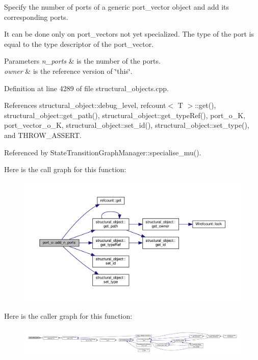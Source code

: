 Specify the number of ports of a generic port\+\_\+vector object and add its corresponding ports. 

It can be done only on port\+\_\+vectors not yet specialized. The type of the port is equal to the type descriptor of the port\+\_\+vector. 
\begin{DoxyParams}{Parameters}
{\em n\+\_\+ports} & is the number of the ports. \\
\hline
{\em owner} & is the reference version of \char`\"{}this\char`\"{}. \\
\hline
\end{DoxyParams}


Definition at line 4289 of file structural\+\_\+objects.\+cpp.



References structural\+\_\+object\+::debug\+\_\+level, refcount$<$ T $>$\+::get(), structural\+\_\+object\+::get\+\_\+path(), structural\+\_\+object\+::get\+\_\+type\+Ref(), port\+\_\+o\+\_\+K, port\+\_\+vector\+\_\+o\+\_\+K, structural\+\_\+object\+::set\+\_\+id(), structural\+\_\+object\+::set\+\_\+type(), and T\+H\+R\+O\+W\+\_\+\+A\+S\+S\+E\+RT.



Referenced by State\+Transition\+Graph\+Manager\+::specialise\+\_\+mu().

Here is the call graph for this function\+:
\nopagebreak
\begin{figure}[H]
\begin{center}
\leavevmode
\includegraphics[width=350pt]{df/d75/structport__o_adf5180258c79071f73582bf9427a8f06_cgraph}
\end{center}
\end{figure}
Here is the caller graph for this function\+:
\nopagebreak
\begin{figure}[H]
\begin{center}
\leavevmode
\includegraphics[width=350pt]{df/d75/structport__o_adf5180258c79071f73582bf9427a8f06_icgraph}
\end{center}
\end{figure}
\mbox{\label{structport__o_a6450d734ab8d67ff5ab6305a09e95a7e}} 
